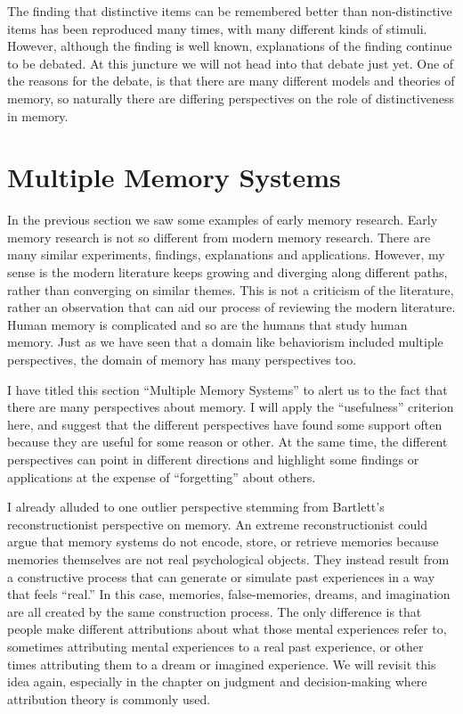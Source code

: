 \documentclass[
  oneside,
  12pt]{crumpbook}
\begin{document}
The finding that distinctive items can be remembered better than non-distinctive items has been reproduced many times, with many different kinds of stimuli. However, although the finding is well known, explanations of the finding continue to be debated. At this juncture we will not head into that debate just yet. One of the reasons for the debate, is that there are many different models and theories of memory, so naturally there are differing perspectives on the role of distinctiveness in memory.

\hypertarget{multiple-memory-systems}{%
\section{Multiple Memory Systems}\label{multiple-memory-systems}}

In the previous section we saw some examples of early memory research. Early memory research is not so different from modern memory research. There are many similar experiments, findings, explanations and applications. However, my sense is the modern literature keeps growing and diverging along different paths, rather than converging on similar themes. This is not a criticism of the literature, rather an observation that can aid our process of reviewing the modern literature. Human memory is complicated and so are the humans that study human memory. Just as we have seen that a domain like behaviorism included multiple perspectives, the domain of memory has many perspectives too.

I have titled this section ``Multiple Memory Systems'' to alert us to the fact that there are many perspectives about memory. I will apply the ``usefulness'' criterion here, and suggest that the different perspectives have found some support often because they are useful for some reason or other. At the same time, the different perspectives can point in different directions and highlight some findings or applications at the expense of ``forgetting'' about others.

I already alluded to one outlier perspective stemming from Bartlett's reconstructionist perspective on memory. An extreme reconstructionist could argue that memory systems do not encode, store, or retrieve memories because memories themselves are not real psychological objects. They instead result from a constructive process that can generate or simulate past experiences in a way that feels ``real.'' In this case, memories, false-memories, dreams, and imagination are all created by the same construction process. The only difference is that people make different attributions about what those mental experiences refer to, sometimes attributing mental experiences to a real past experience, or other times attributing them to a dream or imagined experience. We will revisit this idea again, especially in the chapter on judgment and decision-making where attribution theory is commonly used.
\end{document}
